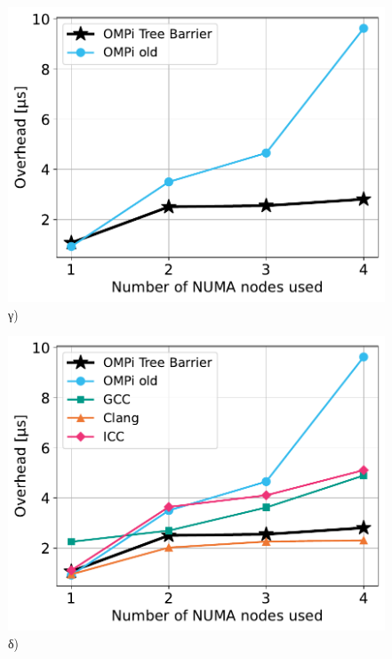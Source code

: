 \begin{figure}[htbp]
\begin{minipage}{0.5\textwidth}
        \centering
        \includegraphics[width=1\textwidth]{Figures/parade-epcc/ompionly_sockets_tpn-16_close.pdf}
        γ)
    \end{minipage}\hfill
    \begin{minipage}{0.5\textwidth}
        \centering
        \includegraphics[width=1\textwidth]{Figures/parade-epcc/sockets_tpn-16_close.pdf}
        δ)
    \end{minipage}
    \newline
    \begin{minipage}{0.5\textwidth}
        \centering

\end{minipage}
\end{figure}
